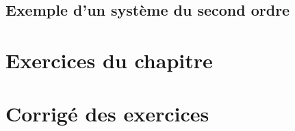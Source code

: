 \begin{figure}[!h]
    \centering
    
    \caption{}
\end{figure}
\subsection{Exemple d'un système du second ordre}


\section{Exercices du chapitre}
\section{Corrigé des exercices}
